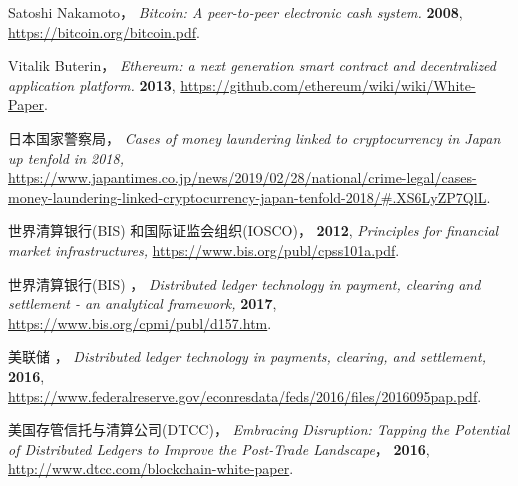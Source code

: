 
\newpage




%

\begin{thebibliography}{99} %

     Satoshi Nakamoto，
    \newblock \textit{Bitcoin: A peer-to-peer electronic cash system.}
    \newblock \textbf{2008},
    \newblock \url{https://bitcoin.org/bitcoin.pdf}.
        
     Vitalik Buterin，
    \newblock \textit{Ethereum: a next generation smart contract and decentralized application platform.}
    \newblock \textbf{2013},
    \newblock \url{https://github.com/ethereum/wiki/wiki/White-Paper}.
    
     日本国家警察局，
    \newblock \textit{Cases of money laundering linked to cryptocurrency in Japan up tenfold in 2018,}
    \newblock \url{https://www.japantimes.co.jp/news/2019/02/28/national/crime-legal/cases-money-laundering-linked-cryptocurrency-japan-tenfold-2018/#.XS6LyZP7QlL}.
    
     世界清算银行(BIS) 和国际证监会组织(IOSCO)，
    \newblock \textbf{2012},
    \newblock \textit{Principles for financial market infrastructures,}
    \newblock \url{https://www.bis.org/publ/cpss101a.pdf}.

     世界清算银行(BIS) ，
    \newblock \textit{Distributed ledger technology in payment, clearing and settlement - an analytical framework,}
    \newblock \textbf{2017},
    \newblock \url{https://www.bis.org/cpmi/publ/d157.htm}.
    
     美联储 ，
    \newblock \textit{Distributed ledger technology in payments, clearing, and settlement,}
    \newblock \textbf{2016},
    \newblock \url{https://www.federalreserve.gov/econresdata/feds/2016/files/2016095pap.pdf}.

     美国存管信托与清算公司(DTCC)，
    \newblock \textit{Embracing Disruption: Tapping the Potential of Distributed Ledgers to Improve the Post-Trade Landscape}，
    \newblock \textbf{2016},
    \newblock \url{http://www.dtcc.com/blockchain-white-paper}.


\end{thebibliography}

